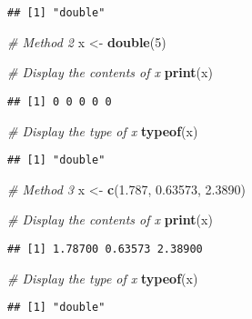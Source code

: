\documentclass[
]{article}
\newenvironment{Shaded}{\begin{snugshade}}{\end{snugshade}}
\newcommand{\CommentTok}[1]{\textcolor[rgb]{0.56,0.35,0.01}{\textit{#1}}}
\newcommand{\DecValTok}[1]{\textcolor[rgb]{0.00,0.00,0.81}{#1}}
\newcommand{\FloatTok}[1]{\textcolor[rgb]{0.00,0.00,0.81}{#1}}
\newcommand{\FunctionTok}[1]{\textcolor[rgb]{0.13,0.29,0.53}{\textbf{#1}}}
\newcommand{\NormalTok}[1]{#1}
\newcommand{\OtherTok}[1]{\textcolor[rgb]{0.56,0.35,0.01}{#1}}
\begin{document}
\begin{verbatim}
## [1] "double"
\end{verbatim}

\begin{Shaded}
\begin{Highlighting}[]
\CommentTok{\# Method 2}
\NormalTok{x }\OtherTok{\textless{}{-}} \FunctionTok{double}\NormalTok{(}\DecValTok{5}\NormalTok{)}

\CommentTok{\# Display the contents of x}
\FunctionTok{print}\NormalTok{(x)}
\end{Highlighting}
\end{Shaded}

\begin{verbatim}
## [1] 0 0 0 0 0
\end{verbatim}

\begin{Shaded}
\begin{Highlighting}[]
\CommentTok{\# Display the type of x}
\FunctionTok{typeof}\NormalTok{(x)}
\end{Highlighting}
\end{Shaded}

\begin{verbatim}
## [1] "double"
\end{verbatim}

\begin{Shaded}
\begin{Highlighting}[]
\CommentTok{\# Method 3}
\NormalTok{x }\OtherTok{\textless{}{-}} \FunctionTok{c}\NormalTok{(}\FloatTok{1.787}\NormalTok{, }\FloatTok{0.63573}\NormalTok{, }\FloatTok{2.3890}\NormalTok{)}

\CommentTok{\# Display the contents of x}
\FunctionTok{print}\NormalTok{(x)}
\end{Highlighting}
\end{Shaded}

\begin{verbatim}
## [1] 1.78700 0.63573 2.38900
\end{verbatim}

\begin{Shaded}
\begin{Highlighting}[]
\CommentTok{\# Display the type of x}
\FunctionTok{typeof}\NormalTok{(x)}
\end{Highlighting}
\end{Shaded}

\begin{verbatim}
## [1] "double"
\end{verbatim}
\end{document}
